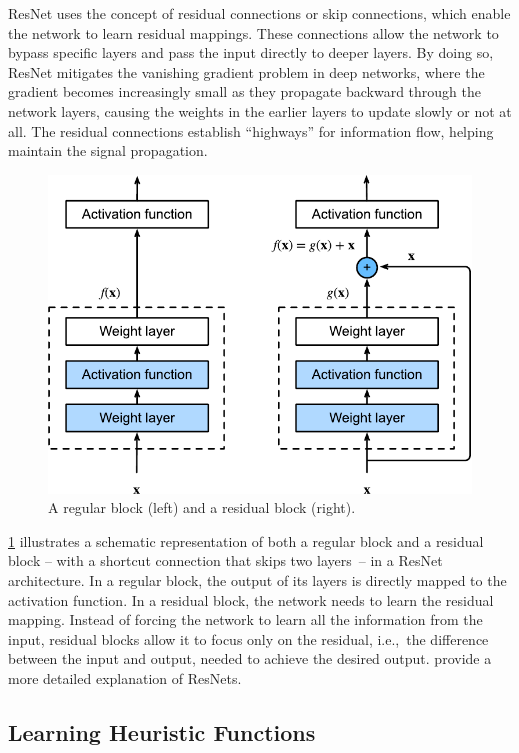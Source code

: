 ResNet uses the concept of residual connections or skip connections, which enable the network to learn residual mappings. These connections allow the network to bypass specific layers and pass the input directly to deeper layers. By doing so, ResNet mitigates the vanishing gradient problem in deep networks, where the gradient becomes increasingly small as they propagate backward through the network layers, causing the weights in the earlier layers to update slowly or not at all. The residual connections establish ``highways'' for information flow, helping maintain the signal propagation.

\begin{figure}[tb]
    \caption[A regular block and a residual block.]{A regular block (left) and a residual block (right).}
    \label{fig:residual-block}
    \addmargin
    \centering
    \includegraphics[width=0.75\linewidth]{figures/residual-block.pdf}
\end{figure}

\cref{fig:residual-block} illustrates a schematic representation of both a regular block and a residual block -- with a shortcut connection that skips two layers~-- in a ResNet architecture. In a regular block, the output of its layers is directly mapped to the activation function. In a residual block, the network needs to learn the residual mapping. Instead of forcing the network to learn all the information from the input, residual blocks allow it to focus only on the residual, i.e.,~the difference between the input and output, needed to achieve the desired output. \citet{he2016deep} provide a more detailed explanation of ResNets.

\subsection{Learning Heuristic Functions}
\label{sec:learning-heuristics}

